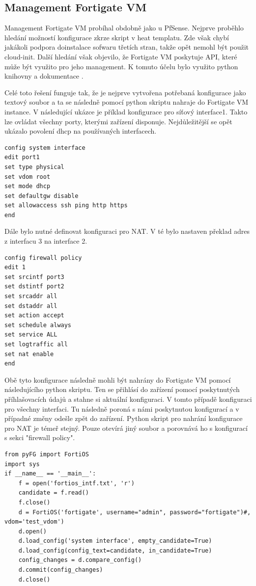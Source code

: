 \subsection{Management Fortigate VM}

Management Fortigate VM probíhal obdobně jako u PfSense. Nejprve proběhlo hledání možností konfigurace zkrze skript v heat templatu. Zde však chybí jakákoli podpora doinstalace sofwaru třetích stran, takže opět nemohl být použit cloud-init. Další hledání však objevilo, že Fortigate VM poskytuje API, které může být využito pro jeho management. K tomuto účelu bylo využito python knihovny a dokumentace \cite{pyfg}.

Celé toto řešení funguje tak, že je nejprve vytvořena potřebaná konfigurace jako textový soubor a ta se následně pomocí python skriptu nahraje do Fortigate VM instance. V následující ukázce je příklad konfigurace pro síťový interface1. Takto lze ovládat všechny porty, kterými zařízení disponuje. Nejdůležitější se opět ukázalo povolení dhcp na používaných interfacech. 

\begin{lstlisting}[caption=Fortigate konfigurace pro interface]
config system interface
edit port1
set type physical
set vdom root
set mode dhcp
set defaultgw disable
set allowaccess ssh ping http https
end
\end{lstlisting}

Dále bylo nutné definovat konfiguraci pro NAT. V té bylo nastaven překlad adres z interfacu 3 na interface 2. 

\begin{lstlisting}[caption=Fortigate konfigurace pro NAT]
config firewall policy
edit 1
set srcintf port3
set dstintf port2
set srcaddr all
set dstaddr all
set action accept
set schedule always
set service ALL
set logtraffic all
set nat enable
end
\end{lstlisting}

Obě tyto konfigurace následně mohli být nahrány do Fortigate VM pomocí následujícího python skriptu. Ten se přihlásí do zařízení pomocí poskytnutých příhlašovacích údajů a stahne si aktuální konfiguraci. V tomto případě konfiguraci pro všechny interfaci. Tu následně poroná s námi poskytnutou konfigurací a v případné změny odešle zpět do zařízení. Python skript pro nahrání konfigurace pro NAT je témeř stejný. Pouze otevírá jiný soubor a porovnává ho s konfigurací s sekci "firewall policy".

\begin{lstlisting}[caption=Skript pro nahrání konfigurace interfaců]
from pyFG import FortiOS
import sys
if __name__ == '__main__':
    f = open('fortios_intf.txt', 'r')
    candidate = f.read()
    f.close()
    d = FortiOS('fortigate', username="admin", password="fortigate")#, vdom='test_vdom')
    d.open()
    d.load_config('system interface', empty_candidate=True)
    d.load_config(config_text=candidate, in_candidate=True)
    config_changes = d.compare_config()
    d.commit(config_changes)
    d.close()
\end{lstlisting}

